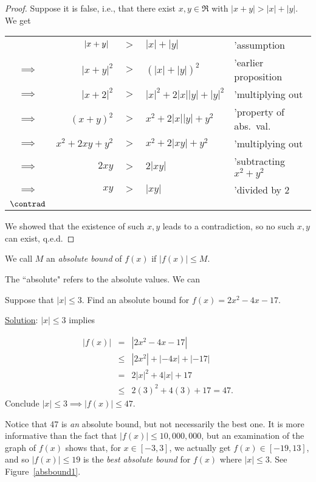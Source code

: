 \begin{proof}
Suppose it is false, i.e., that there exist $x,y\in\Re$ with
\newline $|x+y|>|x|+|y|$.  We get

\noindent
\begin{tabular}{crcll}
&$|x+y|\hphantom{{}^2}$&$>$&$|x|+|y|$&'assumption\\
$\implies$&$|x+y|^2$&$>$&$(|x|+|y|)^2$&'earlier proposition\\
$\implies$&$|x+2|^2$&$>$&$|x|^2+2|x||y|+|y|^2$&'multiplying out\\
$\implies$&$(x+y)^2$&$>$&$x^2+2|x||y|+y^2$&'property of abs.\  val.\\
$\implies$&$x^2+2xy+y^2$&$>$&$x^2+2|xy|+y^2$&'multiplying out\\
$\implies$&$2xy$&$>$&$2|xy|$&'subtracting $x^2+y^2$\\
$\implies$&$xy$&$>$&$|xy|$&'divided by 2\\
$\contrad$ 
\end{tabular} 

\noindent We showed that the existence of such $x,y$ leads to a
contradiction, so no such $x,y$ can exist, q.e.d.
\end{proof}

\begin{definition} We call $M$ an {\em absolute bound}
of $f(x)$ if $|f(x)|\le M$.
\end{definition}

The ``absolute" refers to the absolute values.  We can 
\bigskip

\bex Suppose that $|x|\le3$.  Find an absolute
bound for $f(x)=2x^2-4x-17$.

\underline{Solution}: $|x|\le 3$ implies

\begin{eqnarray*}|f(x)|&=&\left|2x^2-4x-17\right|\\
&\le&|2x^2|+|-4x|+|-17|\\
&=&2|x|^2+4|x|+17\\
&\le&2(3)^2+4(3)+17=47.\end{eqnarray*} 
Conclude $|x|\le3\implies|f(x)|\le47$.  
\eex

Notice that 47 is {\em an} absolute bound, but not necessarily the
best one.  It is more informative than the fact that $|f(x)|\le10,000,000$,
but an examination of the graph of $f(x)$ shows that, for
$x\in[-3,3]$, we actually get $f(x)\in[-19,13]$, and so
$|f(x)|\le19$ is the {\em best absolute bound} for $f(x)$ where
$|x|\le3$.  See Figure~\ref{absbound1}.

